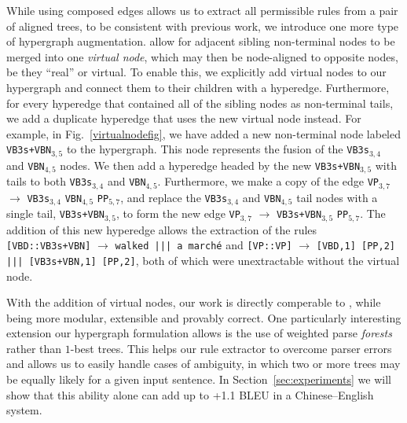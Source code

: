 \documentclass[nofonts]{pbml} %
\begin{document}
While using composed edges allows us to extract all permissible rules from a pair of aligned trees, to be consistent with previous work,
we introduce one more type of hypergraph augmentation.
\citet{hanneman2011general} allow for adjacent sibling non-terminal nodes to be merged into one \emph{virtual node}, which may then be node-aligned to opposite nodes,
be they ``real'' or virtual. To enable this, we explicitly add virtual nodes to our hypergraph and connect them to their children with a hyperedge.
Furthermore, for every hyperedge that contained all of the sibling nodes
as non-terminal tails, we add a duplicate hyperedge that uses the new virtual node instead. For example, in Fig.~\ref{virtualnodefig},
we have added a new non-terminal node labeled \texttt{VB3s+VBN}$_{3,5}$ to the hypergraph. This node represents the fusion of the \texttt{VB3s}$_{3,4}$ and \texttt{VBN}$_{4,5}$ nodes.
We then add a hyperedge headed by the new \texttt{VB3s+VBN}$_{3,5}$ with tails to both \texttt{VB3s}$_{3,4}$ and \texttt{VBN}$_{4,5}$.
Furthermore, we make a copy of the edge \texttt{VP}$_{3,7}$ $\rightarrow$ \texttt{VB3s}$_{3,4}$ \texttt{VBN}$_{4,5}$ \texttt{PP}$_{5,7}$, and replace the
\texttt{VB3s}$_{3,4}$ and \texttt{VBN}$_{4,5}$ tail nodes with a single tail, \texttt{VB3s+VBN}$_{3,5}$, to form the new edge
\texttt{VP}$_{3,7}$ $\rightarrow$ \texttt{VB3s+VBN}$_{3,5}$ \texttt{PP}$_{5,7}$. The addition of this new hyperedge allows the extraction of the rules
\texttt{[VBD::VB3s+VBN]} $\rightarrow$ \texttt{walked ||| a march\'{e}} and
\texttt{[VP::VP]} $\rightarrow$ \texttt{[VBD,1] [PP,2]  ||| [VB3s+VBN,1] [PP,2]}, both of which were unextractable without the virtual node.

With the addition of virtual nodes, our work is directly comperable to \citet{hanneman2011general}, while being more modular, extensible and provably correct.
One particularly interesting extension our hypergraph formulation allows is the use of weighted parse \emph{forests} rather than $1$-best trees.
This helps our rule extractor to overcome parser errors and allows us to easily handle cases of ambiguity, in which two or more trees may be equally likely
for a given input sentence. In Section~\ref{sec:experiments} we will show that this ability alone can add up to +1.1 \textsc{BLEU} \cite{papineni2002bleu} in a Chinese--English system.
\end{document}
